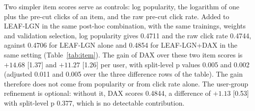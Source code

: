 \documentclass[preprint,12pt,authoryear]{elsarticle}
\begin{document}
Two simpler item scores serve as controls: log popularity, the logarithm of one plus the pre-cut clicks of an item, and the raw
pre-cut click rate. Added to LEAF-LGN in the same post-hoc combination, with the same trainings, weights and validation selection,
log popularity gives 0.4711 and the raw click rate 0.4744, against 0.4706 for LEAF-LGN alone and 0.4854 for LEAF-LGN+DAX in the same
setting (Table~\ref{tab:item}). The gain of DAX over these two item scores is $+14.68$ [1.37] and $+11.27$ [1.26] per user, with
split-level p values 0.005 and 0.002 (adjusted 0.011 and 0.005 over the three difference rows of the table). The gain therefore does
not come from popularity or from click rate alone. The user-group refinement is optional: without it, DAX scores 0.4844, a difference
of $+1.13$ [0.53] with split-level p 0.377, which is no detectable contribution.
\end{document}
